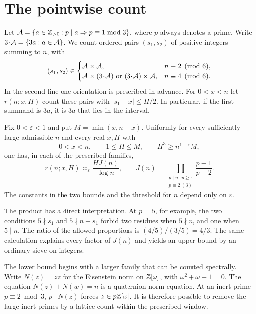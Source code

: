\section{The pointwise count}
Let \(\mathcal A=\{a\in\mathbb Z_{>0}:p\mid a\Rightarrow p\equiv1\bmod3\}\), where \(p\)
always denotes a prime. Write \(3\!\cdot\!\mathcal A=\{3a:a\in\mathcal A\}\).
We count ordered pairs \((s_1,s_2)\) of positive integers summing to
\(n\), with
\[
(s_1,s_2)\in
\begin{cases}
\mathcal A\times\mathcal A,&n\equiv2\pmod6,\\
\mathcal A\times(3\!\cdot\!\mathcal A)\text{ or }(3\!\cdot\!\mathcal A)\times\mathcal A,
 &n\equiv4\pmod6.
\end{cases}
\]
In the second line one orientation is prescribed in advance.
For \(0<x<n\) let \(r(n;x,H)\) count these pairs with
\(|s_1-x|\le H/2\). In particular, if the first summand is \(3a\),
it is \(3a\) that lies in the interval.

\begin{theorem}\label{thm:main}
Fix \(0<\varepsilon<1\) and put \(M=\min(x,n-x)\). Uniformly for
every sufficiently large admissible \(n\) and every real \(x,H\) with
\[
0<x<n,\qquad 1\le H\le M,\qquad H^3\ge n^{1+\varepsilon}M,
\]
one has, in each of the prescribed families,
\begin{equation}\label{eq:main}
r(n;x,H)\asymp_\varepsilon \frac{HJ(n)}{\log n},
\qquad
J(n)=\prod_{\substack{p\mid n,\ p\ge5\\p\equiv2\ (3)}}
             \frac{p-1}{p-2}.
\end{equation}
The constants in the two bounds and the threshold for \(n\) depend
only on \(\varepsilon\).
\end{theorem}

The product has a direct interpretation. At \(p=5\), for example,
the two conditions \(5\nmid s_1\) and \(5\nmid n-s_1\) forbid two
residues when \(5\nmid n\), and one when \(5\mid n\). The ratio of
the allowed proportions is \((4/5)/(3/5)=4/3\). The same calculation
explains every factor of \(J(n)\) and yields an upper bound by an
ordinary sieve on integers.

The lower bound begins with a larger family that can be counted
spectrally. Write \(N(z)=z\bar z\) for the Eisenstein norm on
\(\mathbb Z[\omega]\), with \(\omega^2+\omega+1=0\). The equation
\(N(z)+N(w)=n\) is a quaternion norm equation. At an inert prime
\(p\equiv2\bmod3\), \(p\mid N(z)\) forces \(z\in p\mathbb Z[\omega]\).
It is therefore possible to remove the large inert primes by a
lattice count within the prescribed window.

